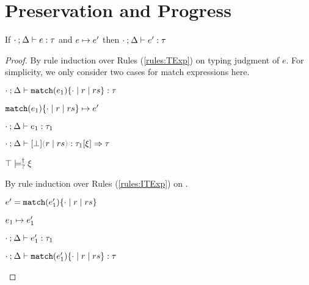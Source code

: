 \section{Preservation and Progress}

\begin{theorem}[Preservation]
  \label{thrm:preservation}
  If $\cdot \mathbin{;} \Delta \vdash e : \tau$ and $e \mapsto e'$
  then $\cdot \mathbin{;} \Delta \vdash e' : \tau$
\end{theorem}
\begin{proof}
By rule induction over Rules (\ref{rules:TExp}) on typing judgment of $e$.
For simplicity, we only consider two cases for match expressions here.
\begin{byCases}
\item[\text{(\ref{rule:TMatchZPre})}]
  \begin{pfsteps*}
  \item $\cdot \mathbin{;} \Delta \vdash \mathtt{match}(e_1) \{\cdot \mid r \mid rs\} : \tau$  
  \item $\mathtt{match}(e_1) \{\cdot \mid r \mid rs\} \mapsto e'$  
  \item $\cdot \mathbin{;} \Delta \vdash e_1 : \tau_1$  
  \item $\chrulstyp{\cdot}{\Delta}{\cfalsity}{\hrulesP{r}{rs}}{\tau_1}{\xi}{\tau}$  
  \item $\top \models_{?}^{\dag} \xi$  
  \end{pfsteps*}
  By rule induction over Rules (\ref{rules:ITExp}) on .
  \begin{byCases}
    
  \item[\text{(\ref{rule:ITExpMatch})}]
    \begin{pfsteps*}
    \item $e' = \mathtt{match}(e_1') \{\cdot \mid r \mid rs\}$ 
    \item $e_1 \mapsto e_1'$  
    \item $\cdot \mathbin{;} \Delta \vdash e_1' : \tau_1$  
    \item $\cdot \mathbin{;} \Delta \vdash \mathtt{match}(e_1') \{\cdot \mid r \mid rs\} : \tau$ 
    \end{pfsteps*}


\end{byCases}
\end{byCases}
\end{proof}
